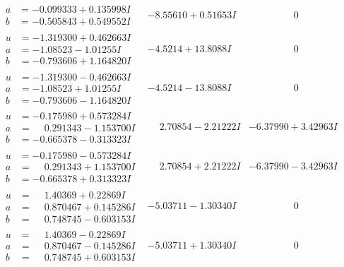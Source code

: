 \documentclass[1p]{elsarticle_modified}
\theoremstyle{definition}
\begin{document}
$$\begin{array}{c|c|c}
\begin{aligned}
a &= -0.099333 + 0.135998 I \\
b &= -0.505843 + 0.549552 I\end{aligned}
 & -8.55610 + 0.51653 I & \phantom{-0.000000 } 0 \\ \hline\begin{aligned}
u &= -1.319300 + 0.462663 I \\
a &= -1.08523 - 1.01255 I \\
b &= -0.793606 + 1.164820 I\end{aligned}
 & -4.5214 + 13.8088 I & \phantom{-0.000000 } 0 \\ \hline\begin{aligned}
u &= -1.319300 - 0.462663 I \\
a &= -1.08523 + 1.01255 I \\
b &= -0.793606 - 1.164820 I\end{aligned}
 & -4.5214 - 13.8088 I & \phantom{-0.000000 } 0 \\ \hline\begin{aligned}
u &= -0.175980 + 0.573284 I \\
a &= \phantom{-}0.291343 - 1.153700 I \\
b &= -0.665378 - 0.313323 I\end{aligned}
 & \phantom{-}2.70854 - 2.21222 I & -6.37990 + 3.42963 I \\ \hline\begin{aligned}
u &= -0.175980 - 0.573284 I \\
a &= \phantom{-}0.291343 + 1.153700 I \\
b &= -0.665378 + 0.313323 I\end{aligned}
 & \phantom{-}2.70854 + 2.21222 I & -6.37990 - 3.42963 I \\ \hline\begin{aligned}
u &= \phantom{-}1.40369 + 0.22869 I \\
a &= \phantom{-}0.870467 + 0.145286 I \\
b &= \phantom{-}0.748745 - 0.603153 I\end{aligned}
 & -5.03711 - 1.30340 I & \phantom{-0.000000 } 0 \\ \hline\begin{aligned}
u &= \phantom{-}1.40369 - 0.22869 I \\
a &= \phantom{-}0.870467 - 0.145286 I \\
b &= \phantom{-}0.748745 + 0.603153 I\end{aligned}
 & -5.03711 + 1.30340 I & \phantom{-0.000000 } 0 \\ \hline\begin{aligned}

\end{aligned}
\end{array}$$
\end{document}

